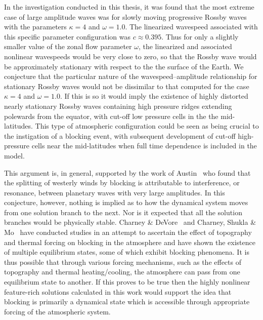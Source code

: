 In the investigation conducted in this thesis, it was found that the most extreme case of large amplitude waves was for slowly moving progressive Rossby waves with the parameters $\kappa=4$ and $\omega=1.0$. The linearized wavespeed associated with this specific parameter configuration was $c\approx 0.395$. Thus for only a slightly smaller value of the zonal flow parameter $\omega$, the linearized and associated nonlinear wavespeeds would be very close to zero, so that the Rossby wave would be approximately stationary with respect to the the surface of the Earth. We conjecture that the particular nature of the wavespeed--amplitude relationship for stationary Rossby waves would not be dissimilar to that computed for the case $\kappa=4$ and $\omega=1.0$. If this is so it would imply the existence of highly distorted nearly stationary Rossby waves containing high pressure ridges extending polewards from the equator, with cut-off low pressure cells in the the mid-latitudes. This type of atmospheric configuration could be seen as being crucial to the instigation of a blocking event, with subsequent development of cut-off high-pressure cells near the mid-latitudes when full time dependence is included in the model. 

This argument is, in general, supported by the work of Austin~\cite{Austin:BML} who found that the splitting of westerly winds by blocking is attributable to interference, or resonance, between planetary waves with very large amplitudes. In this conjecture, however, nothing is implied as to how the dynamical system moves from one solution branch to the next. Nor is it expected that all the solution branches would be physically stable. Charney \& DeVore~\cite{Charney:MFE} and Charney, Shukla \& Mo~\cite{Charney:CBB} have conducted studies in an attempt to ascertain the effect of topography and thermal forcing on blocking in the atmosphere and have shown the existence of multiple equilibrium states, some of which exhibit blocking phenomena. It is thus possible that through various forcing mechanisms, such as the effects of topography and thermal heating/cooling, the atmosphere can pass from one equilibrium state to another. If this proves to be true then the highly nonlinear feature-rich solutions calculated in this work would support the idea that blocking is primarily a dynamical state which is accessible through appropriate forcing of the atmospheric system.

